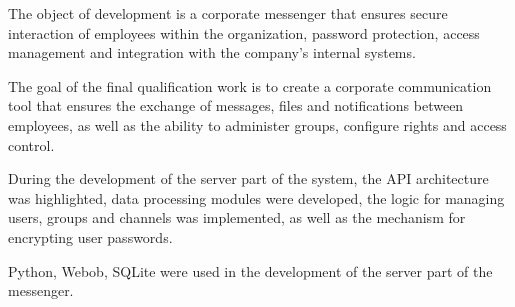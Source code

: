 The object of development is a corporate messenger that ensures secure interaction of employees within the organization, password protection, access management and integration with the company's internal systems.

The goal of the final qualification work is to create a corporate communication tool that ensures the exchange of messages, files and notifications between employees, as well as the ability to administer groups, configure rights and access control.

During the development of the server part of the system, the API architecture was highlighted, data processing modules were developed, the logic for managing users, groups and channels was implemented, as well as the mechanism for encrypting user passwords.

Python, Webob, SQLite were used in the development of the server part of the messenger.

